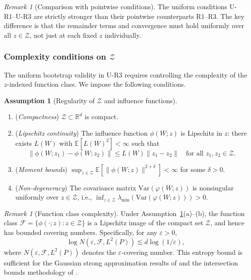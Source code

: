 \documentclass[accepted]{uai2026} %
\theoremstyle{plain}
\theoremstyle{definition}
\newtheorem{assumption}[theorem]{Assumption}
\theoremstyle{remark}
\newtheorem{remark}[theorem]{Remark}
\begin{document}
\begin{remark}[Comparison with pointwise conditions]
The uniform conditions U-R1--U-R3 are strictly stronger than their pointwise
counterparts R1--R3. The key difference is that the remainder terms and
convergence must hold uniformly over all $z \in \mathcal{Z}$, not just at
each fixed $z$ individually.
\end{remark}

\subsubsection{Complexity conditions on $\mathcal{Z}$}
\label{subsubsec:complexity}

The uniform bootstrap validity in U-R3 requires controlling the complexity of
the $z$-indexed function class. We impose the following conditions.

\begin{assumption}[Regularity of $\mathcal{Z}$ and influence functions]
\label{ass:complexity}
\hfill
\begin{enumerate}
  \item[(a)] (\emph{Compactness}) $\mathcal{Z} \subset \mathbb{R}^d$ is compact.
  
  \item[(b)] (\emph{Lipschitz continuity}) The influence function
  $\phi(W;z)$ is Lipschitz in $z$: there exists $L(W)$ with
  $\mathbb{E}[L(W)^2] < \infty$ such that
  \[
    \|\phi(W;z_1) - \phi(W;z_2)\| \le L(W)\|z_1 - z_2\|
    \quad \text{for all } z_1, z_2 \in \mathcal{Z}.
  \]
  
  \item[(c)] (\emph{Moment bounds}) 
  $\sup_{z \in \mathcal{Z}} \mathbb{E}[\|\phi(W;z)\|^{2+\delta}] < \infty$
  for some $\delta > 0$.
  
  \item[(d)] (\emph{Non-degeneracy}) The covariance matrix
  $\mathrm{Var}(\varphi(W;z))$ is nonsingular uniformly over $z \in \mathcal{Z}$,
  i.e., $\inf_{z \in \mathcal{Z}} \lambda_{\min}(\mathrm{Var}(\varphi(W;z))) > 0$.
\end{enumerate}
\end{assumption}

\begin{remark}[Function class complexity]
Under Assumption~\ref{ass:complexity}(a)--(b), the function class
$\mathcal{F} = \{\phi(\cdot;z) : z \in \mathcal{Z}\}$ is a Lipschitz image
of the compact set $\mathcal{Z}$, and hence has bounded covering numbers.
Specifically, for any $\varepsilon > 0$,
\[
  \log N(\varepsilon, \mathcal{F}, L^2(P)) \lesssim d \log(1/\varepsilon),
\]
where $N(\varepsilon, \mathcal{F}, L^2(P))$ denotes the $\varepsilon$-covering
number.  This entropy bound is sufficient for the Gaussian strong
approximation results of \citep{chernozhukov2013gaussian} and the
intersection bounds methodology of \citep{chernozhukov2013intersection}.
\end{remark}
\end{document}
